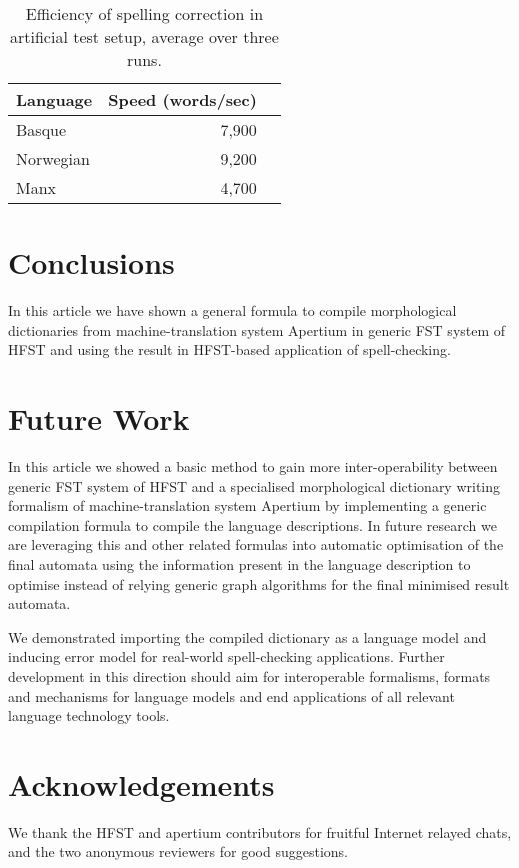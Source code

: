 \documentclass[10pt,a4paper]{article}
\begin{document}
\begin{table}[h]
\begin{center}
\begin{tabular}{|l|r|r|}
\hline
\bf Language & \bf Speed (words/sec) \\
\hline
Basque       &  7,900 \\
Norwegian    &  9,200 \\
Manx         &  4,700 \\
\hline
\end{tabular}
\caption{Efficiency of spelling correction in artificial test setup, average 
  over three runs.}
\label{table:spelling}
\end{center}
\end{table}

\section{Conclusions}
\label{sec:conclusions}

In this article we have shown a general formula to compile morphological
dictionaries from machine-translation system Apertium in generic FST system of
HFST and using the result in HFST-based application of spell-checking.

\section{Future Work}
\label{sec:future}

In this article we showed a basic method to gain more inter-operability between
generic FST system of HFST and a specialised morphological dictionary writing
formalism of machine-translation system Apertium by implementing a generic
compilation formula to compile the language descriptions. In future research
we are leveraging this and other related formulas into automatic optimisation
of the final automata using the information present in the language description
to optimise instead of relying generic graph algorithms for the final minimised
result automata.
 
We demonstrated importing the compiled dictionary as a language model and
inducing error model for real-world spell-checking applications. Further
development in this direction should aim for interoperable formalisms, formats
and mechanisms for language models and end applications of all relevant
language technology tools.

\section*{Acknowledgements}

We thank the HFST and apertium contributors for fruitful Internet relayed chats,
and the two anonymous reviewers for good suggestions.



\end{document}

